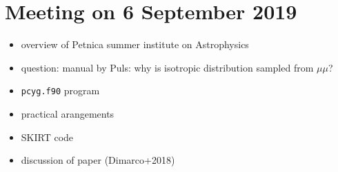 \documentclass[../main/main.tex]{subfiles}
\begin{document}
\section{Meeting on 6 September 2019}

\begin{itemize}
\item overview of Petnica summer institute on Astrophysics

\item question: manual by Puls: why is isotropic distribution sampled from $\mu \mu$?

\item \texttt{pcyg.f90} program

\item practical arangements  

\item SKIRT code 
\item discussion of paper (Dimarco+2018)

\end{itemize}
\end{document}

